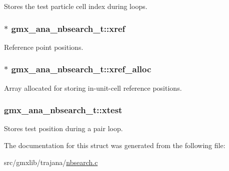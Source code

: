 \-Stores the test particle cell index during loops. \hypertarget{structgmx__ana__nbsearch__t_a760b9baf9b97961c44562c925b51da92}{
\subsubsection[{xref}]{$\ast$ {\bf gmx\-\_\-ana\-\_\-nbsearch\-\_\-t\-::xref}}}\label{structgmx__ana__nbsearch__t_a760b9baf9b97961c44562c925b51da92}
\-Reference point positions. \hypertarget{structgmx__ana__nbsearch__t_a497f8f2e93dc25cba45d8c526065c5b8}{
\subsubsection[{xref\-\_\-alloc}]{$\ast$ {\bf gmx\-\_\-ana\-\_\-nbsearch\-\_\-t\-::xref\-\_\-alloc}}}\label{structgmx__ana__nbsearch__t_a497f8f2e93dc25cba45d8c526065c5b8}
\-Array allocated for storing in-\/unit-\/cell reference positions. \hypertarget{structgmx__ana__nbsearch__t_a67d019011364f9895f4e3283afe560ea}{
\subsubsection[{xtest}]{ {\bf gmx\-\_\-ana\-\_\-nbsearch\-\_\-t\-::xtest}}}\label{structgmx__ana__nbsearch__t_a67d019011364f9895f4e3283afe560ea}
\-Stores test position during a pair loop. 

\-The documentation for this struct was generated from the following file\-:\begin{DoxyCompactItemize}
\item 
src/gmxlib/trajana/\hyperlink{nbsearch_8c}{nbsearch.\-c}\end{DoxyCompactItemize}
